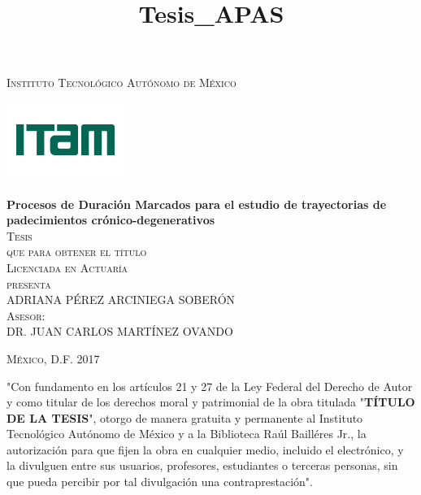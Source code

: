 \documentclass[letterpaper,oneside,11pt,review]{book}
\theoremstyle{plain}
\begin{document}
\pagestyle{empty} %

\title{Tesis_APAS} %

\begin{titlepage}
\begin{center}

\textsc{\Large Instituto Tecnol\'ogico Aut\'onomo de M\'exico}\\[4em]

\begin{center}
	\includegraphics{DocumentosLaTex/ITAM_2016}
\end{center}

\vspace{2em}

{\sc \huge {\bf Procesos de Duraci\'on Marcados para el estudio de trayectorias de padecimientos cr\'onico-degenerativos}}\\[2em]

\textsc{\large Tesis}\\[1em]

\textsc{que para obtener el t\'itulo}\\[1em]

\textsc{Licenciada en Actuar\'ia}\\[1em]

\textsc{presenta}\\[1em]

\textsc{\Large ADRIANA P\'EREZ ARCINIEGA SOBER\'ON }\\[1em]

\textsc{\large Asesor:}\\
\textsc{DR. JUAN CARLOS MART\'INEZ OVANDO}\\[1em]

\end{center}

\vspace*{\fill}
\textsc{M\'exico, D.F. \hspace*{\fill} 2017}

\end{titlepage}

\thispagestyle{empty}
\vspace*{\fill}
\begingroup
"Con fundamento en los art\'iculos 21 y 27 de la Ley Federal del Derecho de Autor y como titular de los derechos moral y patrimonial de la obra titulada "\textbf{T\'ITULO DE LA TESIS}", otorgo de manera gratuita y permanente al Instituto Tecnol\'ogico Aut\'onomo de M\'exico y a la Biblioteca Ra\'ul Baill\'eres Jr., la autorizaci\'on para que fijen la obra en cualquier medio, incluido el electr\'onico, y la divulguen entre sus usuarios, profesores, estudiantes o terceras personas, sin que pueda percibir por tal divulgaci\'on una contraprestaci\'on".
\end{document}
